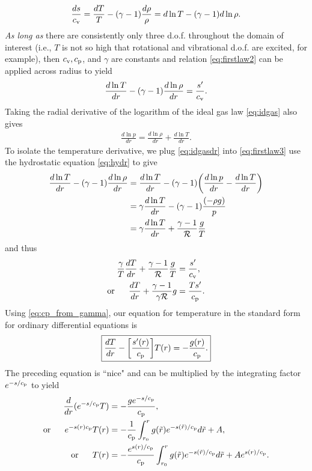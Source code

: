 \documentclass[12pt]{article} %
\newcommand{\cv}{c_{\rm{v}}}
\newcommand{\cp}{c_{\rm{p}}}
\newcommand{\orr}{\text{or}\ \ \ \ \ }
\begin{document}
	\begin{align}
	\frac{ds}{\cv}=\frac{dT}{T} - (\gamma - 1)\frac{d\rho}{\rho} = d\ln{T} - (\gamma - 1)d\ln{\rho}. 
	\label{eq:firstlaw2}	
	\end{align}
	\textit{As long as} there are consistently only three d.o.f. throughout the domain of interest (i.e., $T$ is not so high that rotational and vibrational d.o.f. are excited, for example), then $\cv,\cp$, and $\gamma$ are constants and relation \eqref{eq:firstlaw2} can be applied across radius to yield
	\begin{align}
	\frac{d\ln{T}}{dr} - (\gamma - 1)\frac{d\ln{\rho}}{dr} = \frac{s^\prime}{\cv}.
	\label{eq:firstlaw3}
	\end{align}
	Taking the radial derivative of the logarithm of the ideal gas law \eqref{eq:idgas} also gives
	\begin{align}
	\frac{d\ln{p}}{dr} = \frac{d\ln{\rho}}{dr} + \frac{d\ln{T}}{dr}. 
	\label{eq:idgasdr}
	\end{align}
	To isolate the temperature derivative, we plug \eqref{eq:idgasdr} into \eqref{eq:firstlaw3} use the hydrostatic equation \eqref{eq:hydr} to give
	\begin{align*}
	\frac{d\ln{T}}{dr} - (\gamma - 1)\frac{d\ln{\rho}}{dr} &= \frac{d\ln{T}}{dr} - (\gamma -1)\bigg{(}\frac{d\ln{p}}{dr} - \frac{d\ln{T}}{dr}\bigg{)}\\
	 &=\gamma \frac{d\ln{T}}{dr} - (\gamma - 1)\frac{(-\rho g)}{p}\\
	 &= \gamma \frac{d\ln{T}}{dr} + \frac{\gamma - 1}{\mathcal{R}}\frac{g}{T}
	\end{align*}
	and thus
	\begin{align*}
	\frac{\gamma}{T}\frac{dT}{dr} + \frac{\gamma - 1}{\mathcal{R}}\frac{g}{T} &= \frac{s^\prime}{\cv},\\
	\orr \frac{dT}{dr} + \frac{\gamma - 1}{\gamma \mathcal{R}}g &= \frac{Ts^\prime}{\cp}.
	\end{align*}
	Using \eqref{eq:cp_from_gamma}, our equation for temperature in the standard form for ordinary differential equations is
	\begin{align}
	\boxed{
	\frac{dT}{dr} - \bigg{[}\frac{s^\prime(r)}{\cp}\bigg{]}T(r) = -\frac{g(r)}{\cp}.
}
\label{eq:tdiffeq}
	\end{align}
	The preceding equation is ``nice" and can be multiplied by the integrating factor $e^{-s/\cp}$ to yield
	\begin{align}
	\frac{d}{dr}(e^{-s/\cp}T)&=-\frac{ge^{-s/\cp}}{\cp},\nonumber\\
	\orr e^{-s(r)\cp}T(r) &=-\frac{1}{\cp}\int_{r_0}^r g(\tilde{r})e^{-s(\tilde{r})/\cp}d\tilde{r} + A,\nonumber\\
	\orr T(r) &= -\frac{e^{s(r)/\cp}}{\cp}\int_{r_0}^r g(\tilde{r})e^{-s(\tilde{r})/\cp}d\tilde{r} + Ae^{s(r)/\cp}.\nonumber
	\end{align}
\end{document}
